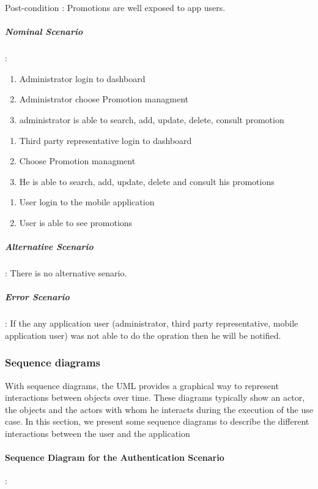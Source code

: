Post-condition : Promotions are well exposed to app users.

\subparagraph{Nominal Scenario} :
\label{sec:sec01}

 \begin{enumerate}
   \item Administrator login to dashboard
   \item Administrator choose Promotion managment
   \item administrator is able to search, add, update, delete, consult promotion
 \end{enumerate}

 \begin{enumerate}
   \item Third party representative login to dashboard
   \item Choose Promotion managment
   \item He is able to search, add, update, delete and consult his promotions
 \end{enumerate}

 \begin{enumerate}
   \item User login to the mobile application
   \item User is able to see promotions
 \end{enumerate}


\subparagraph{Alternative Scenario} :
\label{sec:sec01}
There is no alternative senario.
\subparagraph{Error Scenario} :
\label{sec:sec01}
If the any application user (administrator, third party representative, mobile application user) was not able to do the opration then he will be notified.

\newpage
\subsubsection{Sequence diagrams}
\label{sec:sec01}
With sequence diagrams, the UML provides a graphical way to represent interactions between objects over time. These diagrams typically show an actor, the objects and the actors with whom he interacts during the execution of the use case. In this section, we present some sequence diagrams to describe the different interactions between the user and the application

\paragraph{Sequence Diagram for the Authentication Scenario} :
\label{sec:sec01}

